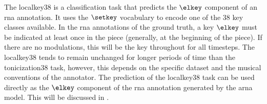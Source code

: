 
The \gls{localkey38} is a classification task that predicts
the $\elkey$ component of an \gls{rna} annotation. It uses
the $\setkey$ vocabulary to encode one of the 38 key classes
available. In the \gls{rna} annotations of the ground truth,
a key $\elkey$ must be indicated at least once in the piece
(generally, at the beginning of the piece). If there are no
modulations, this will be the key throughout for all
timesteps. The \gls{localkey38} tends to remain unchanged
for longer periods of time than the \gls{tonicization38}
task, however, this depends on the specific dataset and the
musical conventions of the annotator. The prediction of the
\gls{localkey38} task can be used directly as the $\elkey$
component of the \gls{rna} annotation generated by the
\gls{arna} model. This will be discussed in
.


